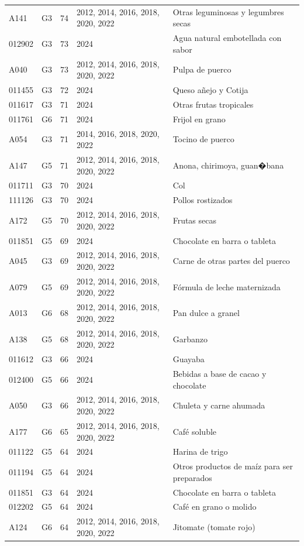 \begin{table}[ht]
\begin{tabular}{llrll}
  A141 & G3 &  74 & 2012, 2014, 2016, 2018, 2020, 2022 & Otras leguminosas y legumbres secas \\ 
  012902 & G3 &  73 & 2024 & Agua natural embotellada con sabor \\ 
  A040 & G3 &  73 & 2012, 2014, 2016, 2018, 2020, 2022 & Pulpa de puerco \\ 
  011455 & G3 &  72 & 2024 & Queso añejo y Cotija \\ 
  011617 & G3 &  71 & 2024 & Otras frutas tropicales \\ 
  011761 & G6 &  71 & 2024 & Frijol en grano \\ 
  A054 & G3 &  71 & 2014, 2016, 2018, 2020, 2022 & Tocino de puerco \\ 
  A147 & G5 &  71 & 2012, 2014, 2016, 2018, 2020, 2022 & Anona, chirimoya, guan�bana \\ 
  011711 & G3 &  70 & 2024 & Col \\ 
  111126 & G3 &  70 & 2024 & Pollos rostizados \\ 
  A172 & G5 &  70 & 2012, 2014, 2016, 2018, 2020, 2022 & Frutas secas \\ 
  011851 & G5 &  69 & 2024 & Chocolate en barra o tableta \\ 
  A045 & G3 &  69 & 2012, 2014, 2016, 2018, 2020, 2022 & Carne de otras partes del puerco \\ 
  A079 & G5 &  69 & 2012, 2014, 2016, 2018, 2020, 2022 & Fórmula de leche maternizada \\ 
  A013 & G6 &  68 & 2012, 2014, 2016, 2018, 2020, 2022 & Pan dulce a granel \\ 
  A138 & G5 &  68 & 2012, 2014, 2016, 2018, 2020, 2022 & Garbanzo \\ 
  011612 & G3 &  66 & 2024 & Guayaba \\ 
  012400 & G5 &  66 & 2024 & Bebidas a base de cacao y chocolate \\ 
  A050 & G3 &  66 & 2012, 2014, 2016, 2018, 2020, 2022 & Chuleta y carne ahumada \\ 
  A177 & G6 &  65 & 2012, 2014, 2016, 2018, 2020, 2022 & Café soluble \\ 
  011122 & G5 &  64 & 2024 & Harina de trigo \\ 
  011194 & G5 &  64 & 2024 & Otros productos de maíz para ser preparados \\ 
  011851 & G3 &  64 & 2024 & Chocolate en barra o tableta \\ 
  012202 & G5 &  64 & 2024 & Café en grano o molido \\ 
  A124 & G6 &  64 & 2012, 2014, 2016, 2018, 2020, 2022 & Jitomate (tomate rojo) \\ 

\end{tabular}
\end{table}

